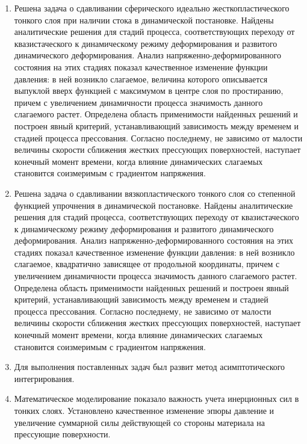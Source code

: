 \begin{enumerate}
  \item Решена задача о сдавливании сферического идеально жесткопластического тонкого слоя при наличии стока в динамической постановке. Найдены аналитические решения для стадий процесса, соответствующих переходу от квазистаческого к динамическому режиму деформирования и развитого динамического деформирования. Анализ напряженно-деформированного состояния на этих стадиях показал качественное изменение функции давления: в ней возникло слагаемое, величина которого описывается выпуклой вверх функцией с максимумом в центре слоя по простиранию, причем с увеличением динамичности процесса значимость данного слагаемого растет. Определена область применимости найденных решений и построен явный критерий, устанавливающий зависимость между временем и стадией процесса прессования.  Согласно последнему, не зависимо от малости величины скорости сближения жестких прессующих поверхностей, наступает конечный момент времени, когда влияние динамических слагаемых становится соизмеримым с градиентом напряжения.
  \item Решена задача о сдавливании вязкопластического тонкого слоя со степенной функцией упрочнения в динамической постановке. Найдены аналитические решения для стадий процесса, соответствующих переходу от квазистаческого к динамическому режиму деформирования и развитого динамического деформирования. Анализ напряженно-деформированного состояния на этих стадиях показал качественное изменение функции давления: в ней возникло слагаемое, квадратично зависящее от продольной координаты, причем с увеличением динамичности процесса значимость данного слагаемого растет. Определена область применимости найденных решений и построен явный критерий, устанавливающий зависимость между временем и стадией процесса прессования.  Согласно последнему, не зависимо от малости величины скорости сближения жестких прессующих поверхностей, наступает конечный момент времени, когда влияние динамических слагаемых становится соизмеримым с градиентом напряжения.
  \item Для выполнения поставленных задач был развит метод асимптотического интегрирования.
  \item Математическое моделирование показало важность учета инерционных сил в тонких слоях. Установлено качественное изменение эпюры давление и увеличение суммарной силы действующей со стороны материала на прессующие поверхности.
\end{enumerate}
